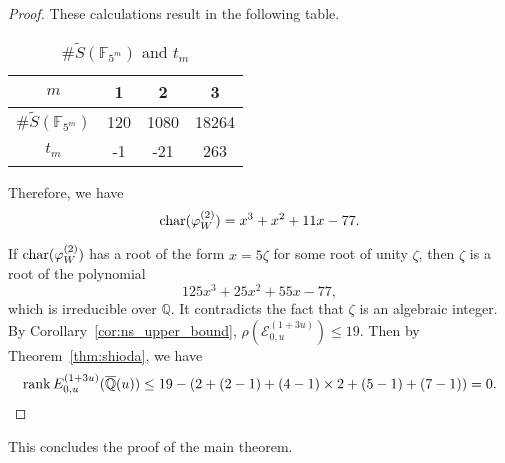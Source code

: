 \documentclass[main]{subfiles}
\begin{document}
\begin{proof}
    These calculations result in the following table.
    \begin{table}[hb]
        \centering
        \caption{$\# \tilde{S}(\mathbb{F}_{5^{m}})$ and $t_{m}$}
        \begin{tabular}{|c|c|c|c|}
            \hline
            $m$                                & 1   & 2    & 3     \\
            \hline
            $\# \tilde{S}(\mathbb{F}_{5^m})$ & 120 & 1080 & 18264 \\
            \hline
            $t_m$                            & -1  & -21  & 263   \\
            \hline
        \end{tabular}
    \end{table}

    Therefore, we have
    \begin{equation*}
        \operatorname{char}(\varphi_{W}^{(2)}) = x^{3} + x^{2} + 11 x - 77.
    \end{equation*}

    If $\operatorname{char} (\varphi_{W}^{(2)})$ has a root of the form $x=5 \zeta$ for some root of unity $\zeta$, then $\zeta$ is a root of the polynomial
    \begin{equation*}
        125x^{3} + 25x^{2} + 55 x - 77,
    \end{equation*}
    which is irreducible over $\mathbb{Q}$.
    It contradicts the fact that $\zeta$ is an algebraic integer.
    By Corollary~\ref{cor:ns_upper_bound}, $\rho(\mathcal{E}_{0,u}^{(1 + 3u)}) \leq 19$.
    Then by Theorem~\ref{thm:shioda}, we have
    \begin{equation*}
        \operatorname{rank} E_{0,u}^{(1 + 3u)}(\overline{\mathbb{Q}}(u)) \leq 19 - (2 + (2 - 1) + (4 - 1) \times 2 + (5 - 1) + (7 - 1)) = 0.
    \end{equation*}
\end{proof}

This concludes the proof of the main theorem.
\end{document}

